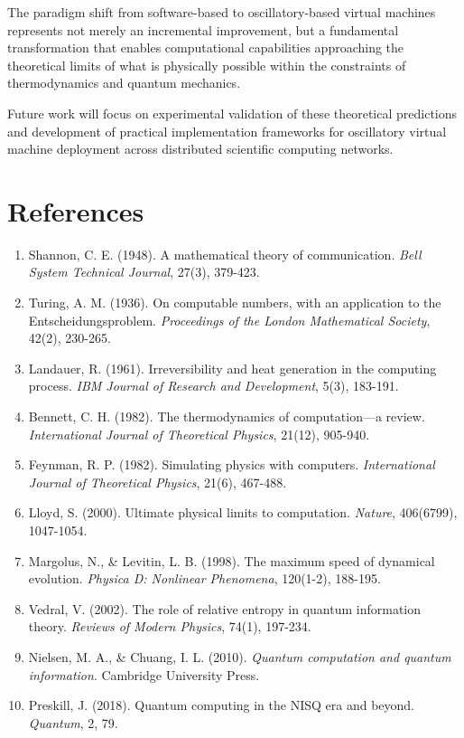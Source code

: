 \documentclass[12pt,a4paper]{article}
\begin{document}
The paradigm shift from software-based to oscillatory-based virtual machines represents not merely an incremental improvement, but a fundamental transformation that enables computational capabilities approaching the theoretical limits of what is physically possible within the constraints of thermodynamics and quantum mechanics.

Future work will focus on experimental validation of these theoretical predictions and development of practical implementation frameworks for oscillatory virtual machine deployment across distributed scientific computing networks.

\section{References}

\begin{enumerate}
\item Shannon, C. E. (1948). A mathematical theory of communication. \textit{Bell System Technical Journal}, 27(3), 379-423.
\item Turing, A. M. (1936). On computable numbers, with an application to the Entscheidungsproblem. \textit{Proceedings of the London Mathematical Society}, 42(2), 230-265.
\item Landauer, R. (1961). Irreversibility and heat generation in the computing process. \textit{IBM Journal of Research and Development}, 5(3), 183-191.
\item Bennett, C. H. (1982). The thermodynamics of computation—a review. \textit{International Journal of Theoretical Physics}, 21(12), 905-940.
\item Feynman, R. P. (1982). Simulating physics with computers. \textit{International Journal of Theoretical Physics}, 21(6), 467-488.
\item Lloyd, S. (2000). Ultimate physical limits to computation. \textit{Nature}, 406(6799), 1047-1054.
\item Margolus, N., & Levitin, L. B. (1998). The maximum speed of dynamical evolution. \textit{Physica D: Nonlinear Phenomena}, 120(1-2), 188-195.
\item Vedral, V. (2002). The role of relative entropy in quantum information theory. \textit{Reviews of Modern Physics}, 74(1), 197-234.
\item Nielsen, M. A., & Chuang, I. L. (2010). \textit{Quantum computation and quantum information}. Cambridge University Press.
\item Preskill, J. (2018). Quantum computing in the NISQ era and beyond. \textit{Quantum}, 2, 79.
\end{enumerate}
\end{document}
